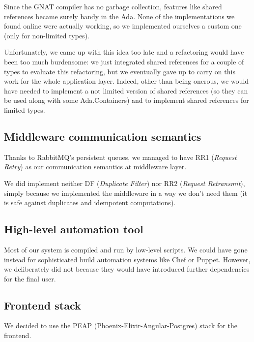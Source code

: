 Since the GNAT compiler has no garbage collection, features like shared references became
surely handy in the Ada. None of the implementations we found online were
actually working, so we implemented ourselves a custom one (only for non-limited
types).

Unfortunately, we came up with this idea too late and a refactoring would have
been too much burdensome: we just integrated shared references for a couple of
types to evaluate this refactoring, but we eventually gave up to carry on this
work for the whole application layer.
Indeed, other than being onerous, we would have needed to implement a not
limited version of shared references (so they can be used along with some
Ada.Containers) and to implement shared references for limited types.


\subsection{Middleware communication semantics}
Thanks to RabbitMQ's persistent queues, we managed to have RR1
(\textit{Request Retry}) as our communication semantics at middleware layer.

We did implement neither DF (\textit{Duplicate Filter}) nor RR2
(\textit{Request Retransmit}), simply because we implemented
the middleware in
a way we don't need them
(it is safe against duplicates and idempotent
computations).

\subsection{High-level automation tool}
Most of our system is compiled and run by low-level scripts.
We could have gone instead for sophisticated build automation
systems like Chef or Puppet. However, we deliberately did not
because they would
have introduced further dependencies for the final user.

\subsection{Frontend stack}
We decided to use the PEAP (Phoenix-Elixir-Angular-Postgres) stack for the
frontend.

